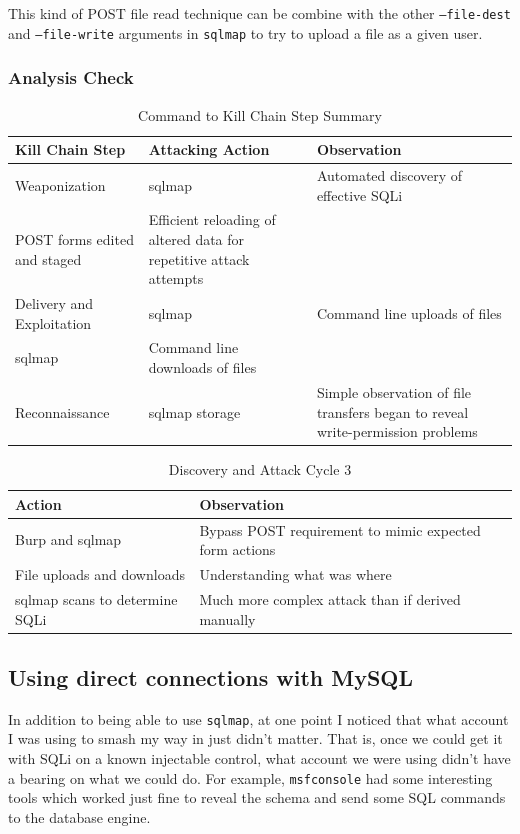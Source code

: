 This kind of POST file read technique can be combine with the other \texttt{--file-dest} and \texttt{--file-write} arguments in \texttt{sqlmap} to try to upload a file as a given user.

\subsubsection{Analysis Check}
\begin{table}[H]
\caption{Command to Kill Chain Step Summary}
\centering
\begin{tabular}{|l|l|l|}
\hline
Kill Chain Step & Attacking Action & Observation \\
\hline
Weaponization & sqlmap & Automated discovery of effective SQLi \\
POST forms edited and staged & Efficient reloading of altered data for repetitive \gls{attack} attempts &  \\
Delivery and Exploitation & sqlmap & Command line uploads of files \\
sqlmap & Command line downloads of files &  \\
Reconnaissance & sqlmap storage & Simple observation of file transfers began to reveal write-permission problems \\
\hline
\end{tabular}
\end{table}

\begin{table}[H]
\caption{Discovery and Attack Cycle 3}
\centering
\begin{tabular}{|l|l|}
\hline
Action & Observation \\
\hline
Burp and sqlmap & Bypass POST requirement to mimic expected form actions \\
File uploads and downloads & Understanding what was where \\
sqlmap scans to determine SQLi & Much more complex attack than if derived manually \\
\hline
\end{tabular}
\end{table}


\subsection{Using direct connections with MySQL}
In addition to being able to use \texttt{sqlmap}, at one point I noticed that what account I was using to smash my way in just didn't matter.  That is, once we could get it with SQLi on a known injectable control, what account we were using didn't have a bearing on what we could do.  For example, \texttt{msfconsole} had some interesting tools which worked just fine to reveal the schema and send some SQL commands to the database engine.

